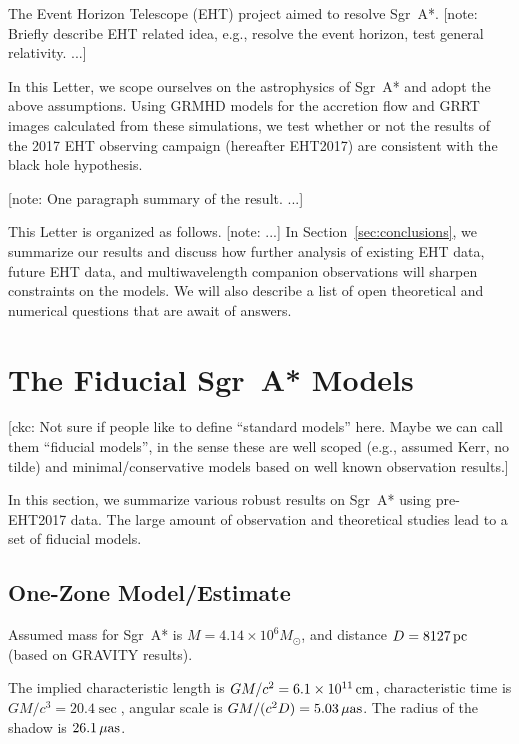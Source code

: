 \documentclass[twocolumn,tighten,dvipsnames]{aastex63}
\newcommand\sgra{Sgr~A*\xspace}
\newcommand\mbh{{M}} %
\newcommand\msun{{M_\odot}}
\newcommand\cm{{\rm \, cm}}
\newcommand\pc{{\rm \, pc}}
\newcommand\uas{{\rm \, \mu as}}
\newcommand\<{{\langle}}
\renewcommand\>{{\rangle}} %
\newcommand\note[1]{{\color{OliveGreen}[note: #1]}}
\newcommand\ckc[1]{{\color{MidnightBlue}[ckc: #1]}}
\begin{document}
The Event Horizon Telescope (EHT) project aimed to resolve \sgra.
\note{Briefly describe EHT related idea, e.g., resolve the event
  horizon, test general relativity.
  ...}

In this Letter, we scope ourselves on the astrophysics of \sgra and
adopt the above assumptions.
Using GRMHD models for the accretion flow and GRRT images calculated
from these simulations, we test whether or not the results of the 2017
EHT observing campaign (hereafter EHT2017) are consistent with the
black hole hypothesis.

\note{One paragraph summary of the result.
  ...}

This Letter is organized as follows.
\note{...}
In Section~\ref{sec:conclusions}, we summarize our results and discuss
how further analysis of existing EHT data, future EHT data, and
multiwavelength companion observations will sharpen constraints on the
models.
We will also describe a list of open theoretical and numerical
questions that are await of answers.

\section{The Fiducial \sgra Models}
\label{sec:basemodels}

\ckc{Not sure if people like to define ``standard models'' here.
  Maybe we can call them ``fiducial models'', in the sense these are
  well scoped (e.g., assumed Kerr, no tilde) and minimal/conservative
  models based on well known observation results.}

In this section, we summarize various robust results on \sgra using
pre-EHT2017 data.
The large amount of observation and theoretical studies lead to a set
of fiducial models.

\subsection{One-Zone Model/Estimate}

Assumed mass for \sgra is
$\mbh = 4.14 \times 10^6 \msun$,
and distance
$D = 8127\pc$
(based on GRAVITY results).

The implied characteristic length is
$G\mbh/c^2 = 6.1 \times 10^{11}\cm$,
characteristic time is
$G\mbh/c^3 = 20.4 \sec$,
angular scale is
$G\mbh/(c^2 D) = 5.03\uas$.
The radius of the shadow is $26.1\uas$.
\end{document}
